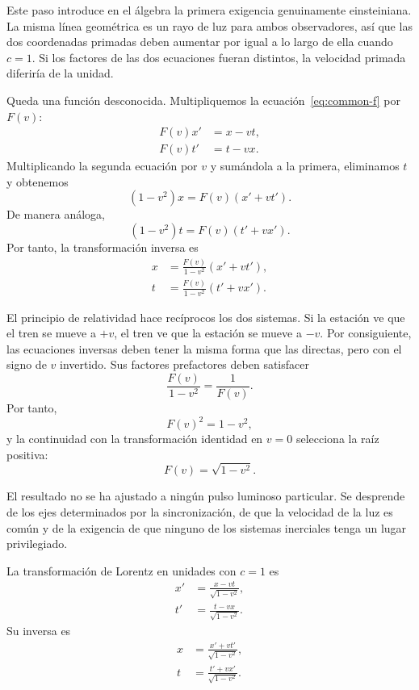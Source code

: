 Este paso introduce en el álgebra la primera exigencia genuinamente einsteiniana. La misma línea geométrica es un rayo de luz para ambos observadores, así que las dos coordenadas primadas deben aumentar por igual a lo largo de ella cuando \(c=1\). Si los factores de las dos ecuaciones fueran distintos, la velocidad primada diferiría de la unidad.

Queda una función desconocida. Multipliquemos la ecuación~\eqref{eq:common-f} por \(F(v)\):
\begin{align}
F(v)x'&=x-vt,\\
F(v)t'&=t-vx.
\end{align}
Multiplicando la segunda ecuación por \(v\) y sumándola a la primera, eliminamos \(t\) y obtenemos
\begin{equation}
(1-v^2)x=F(v)(x'+vt').
\end{equation}
De manera análoga,
\begin{equation}
(1-v^2)t=F(v)(t'+vx').
\end{equation}
Por tanto, la transformación inversa es
\begin{align}
x&=\frac{F(v)}{1-v^2}(x'+vt'),\\
t&=\frac{F(v)}{1-v^2}(t'+vx').
\end{align}

El principio de relatividad hace recíprocos los dos sistemas. Si la estación ve que el tren se mueve a \(+v\), el tren ve que la estación se mueve a \(-v\). Por consiguiente, las ecuaciones inversas deben tener la misma forma que las directas, pero con el signo de \(v\) invertido. Sus factores prefactores deben satisfacer
\begin{equation}
\frac{F(v)}{1-v^2}=\frac{1}{F(v)}.
\end{equation}
Por tanto,
\begin{equation}
F(v)^2=1-v^2,
\end{equation}
y la continuidad con la transformación identidad en \(v=0\) selecciona la raíz positiva:
\begin{equation}
F(v)=\sqrt{1-v^2}.
\end{equation}

El resultado no se ha ajustado a ningún pulso luminoso particular. Se desprende de los ejes determinados por la sincronización, de que la velocidad de la luz es común y de la exigencia de que ninguno de los sistemas inerciales tenga un lugar privilegiado.

La transformación de Lorentz en unidades con \(c=1\) es
\begin{align}
x'&=\frac{x-vt}{\sqrt{1-v^2}},\\
t'&=\frac{t-vx}{\sqrt{1-v^2}}.
\label{eq:lorentz-c-one}
\end{align}
Su inversa es
\begin{align}
x&=\frac{x'+vt'}{\sqrt{1-v^2}},\\
t&=\frac{t'+vx'}{\sqrt{1-v^2}}.
\end{align}

